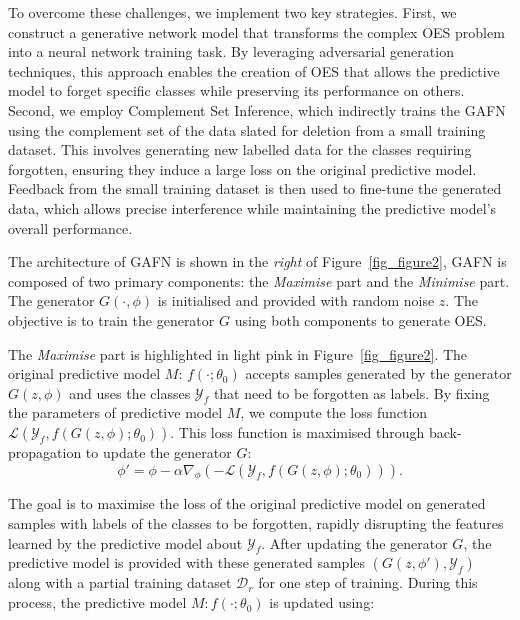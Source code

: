\documentclass[preprint,12pt]{elsarticle}
\begin{document}
To overcome these challenges, we implement two key strategies. First, we construct a generative network model that transforms the complex OES problem into a neural network training task. By leveraging adversarial generation techniques, this approach enables the creation of OES that allows the predictive model to forget specific classes while preserving its performance on others. Second, we employ Complement Set Inference, which indirectly trains the GAFN using the complement set of the data slated for deletion from a small training dataset. This involves generating new labelled data for the classes requiring forgotten, ensuring they induce a large loss on the original predictive model. Feedback from the small training dataset is then used to fine-tune the generated data, which allows precise interference while maintaining the predictive model’s overall performance.

The architecture of GAFN is shown in the \textit{right} of Figure~\ref{fig_figure2}, GAFN is composed of two primary components: the \textit{Maximise} part and the \textit{Minimise} part. The generator \(G(\cdot, \phi)\) is initialised and provided with random noise \(z\). The objective is to train the generator \(G\) using both components to generate OES.

The \textit{Maximise} part is highlighted in light pink in Figure~\ref{fig_figure2}. The original predictive model $M$: $f(\cdot; \theta_0)$ accepts samples generated by the generator \(G(z, \phi)\) and uses the classes \(\mathcal{Y}_f\) that need to be forgotten as labels. By fixing the parameters of predictive model $M$, we compute the loss function \(\mathcal{L}(\mathcal{Y}_f, f(G(z, \phi); \theta_0))\). This loss function is maximised through back-propagation to update the generator \(G\):
\begin{equation}
\phi' = \phi - \alpha \nabla_\phi \left(-\mathcal{L}(\mathcal{Y}_f, f(G(z, \phi); \theta_0))\right).
\end{equation}

The goal is to maximise the loss of the original predictive model on generated samples with labels of the classes to be forgotten, rapidly disrupting the features learned by the predictive model about \( \mathcal{Y}_f \). After updating the generator \(G\), the predictive model is provided with these generated samples \((G(z, \phi'), \mathcal{Y}_f)\) along with a partial training dataset \( \mathcal{D}_r \) for one step of training. During this process, the predictive model \(M: f(\cdot; \theta_0)\) is updated using:
\end{document}
